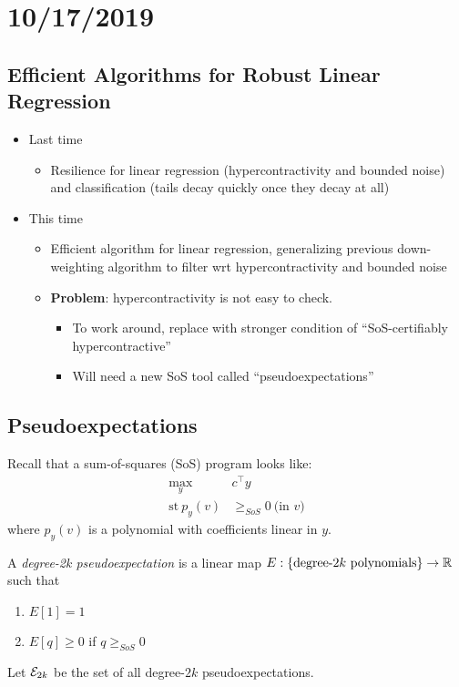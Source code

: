 \section{10/17/2019}

\subsection{Efficient Algorithms for Robust Linear Regression}

\begin{itemize}
  \item Last time
    \begin{itemize}
      \item Resilience for linear regression (hypercontractivity and bounded noise)
	and classification (tails decay quickly once they decay at all)
    \end{itemize}
  \item This time
    \begin{itemize}
    	\item Efficient algorithm for linear regression, generalizing previous
	  down-weighting algorithm to filter wrt hypercontractivity and
	  bounded noise
	\item \textbf{Problem}: hypercontractivity is not easy to check.
	  \begin{itemize}
	    \item To work around, replace with stronger condition of
	      ``SoS-certifiably hypercontractive''
	    \item Will need a new SoS tool called ``pseudoexpectations''
	  \end{itemize}
    \end{itemize}
\end{itemize}

\subsection{Pseudoexpectations}

Recall that a sum-of-squares (SoS) program looks like:
\begin{align}
  \max_{y}~& c^\top y  \\
  \text{st}~ p_y(v) &\geq_{SoS} 0~\text{(in $v$)}
\end{align}
where $p_y(v)$ is a polynomial with coefficients linear in $y$.

\begin{definition}[Pseudoexpectation]
  A \emph{degree-2k pseudoexpectation} is a linear map 
  $E : \{\text{degree-$2k$ polynomials}\} \to \mathbb{R}$ such that
  \begin{enumerate}
    \item $E[1] = 1$
    \item $E[q] \geq 0$ if $q \geq_{SoS} 0$
  \end{enumerate}

  Let $\mathcal{E}_{2k}$ be the set of all degree-$2k$ pseudoexpectations.
\end{definition}

